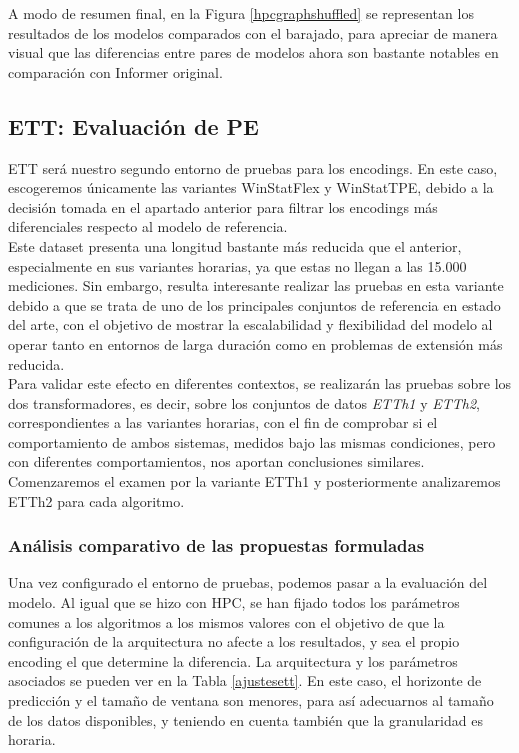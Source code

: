 A modo de resumen final, en la Figura \ref{hpcgraphshuffled} se representan los resultados de los modelos comparados con el barajado, para apreciar de manera visual que las diferencias entre pares de modelos ahora son bastante notables en comparación con Informer original.


\subsection{ETT: Evaluación de PE}

ETT será nuestro segundo entorno de pruebas para los encodings. En este caso, escogeremos únicamente las variantes WinStatFlex y WinStatTPE, debido a la decisión tomada en el apartado anterior para filtrar los encodings más diferenciales respecto al modelo de referencia. \\

Este dataset presenta una longitud bastante más reducida que el anterior, especialmente en sus variantes horarias, ya que estas no llegan a las 15.000 mediciones. Sin embargo, resulta interesante realizar las pruebas en esta variante debido a que se trata de uno de los principales conjuntos de referencia en estado del arte, con el objetivo de mostrar la escalabilidad y flexibilidad del modelo al operar tanto en entornos de larga duración como en problemas de extensión más reducida.\\

 Para validar este efecto en diferentes contextos, se realizarán las pruebas sobre los dos transformadores, es decir, sobre los conjuntos de datos \textit{ETTh1} y \textit{ETTh2}, correspondientes a las variantes horarias, con el fin de comprobar si el comportamiento de ambos sistemas, medidos bajo las mismas condiciones, pero con diferentes comportamientos, nos aportan conclusiones similares. Comenzaremos el examen por la variante ETTh1 y posteriormente analizaremos ETTh2 para cada algoritmo.


\subsubsection{Análisis comparativo de las propuestas formuladas}


Una vez configurado el entorno de pruebas, podemos pasar a la evaluación del modelo. Al igual que se hizo con HPC, se han fijado todos los parámetros comunes a los algoritmos a los mismos valores con el objetivo de que la configuración de la arquitectura no afecte a los resultados, y sea el propio encoding el que determine la diferencia. La arquitectura y los parámetros asociados se pueden ver en la Tabla \ref{ajustesett}. En este caso, el horizonte de predicción y el tamaño de ventana son menores, para así adecuarnos al tamaño de los datos disponibles, y teniendo en cuenta también que la granularidad es horaria.

